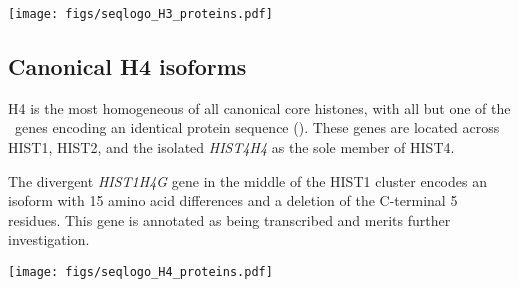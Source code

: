     \begin{table}
      \caption{%
        Canonical H3 encoded protein isoforms.
        Upper panel shows isoform variations relative to most common isoform
        using HGVS recommended nomenclature \citep{mutnomenclature2003}.
        Lower panel shows sequence logo of all isoforms aligned
        with invariant residues in grey.
      }
      \label{tab:H3-consensus}
      
      \texttt{[image: figs/seqlogo\_H3\_proteins.pdf]}
    \end{table}

  \subsection{Canonical H4 isoforms}
    H4 is the most homogeneous of all canonical core histones,
    with all but one of the \HFourCodingGenes{}~genes encoding
    an identical protein sequence ().
    These genes are located across HIST1, HIST2, and the isolated
    \textit{HIST4H4} as the sole member of HIST4.

    The divergent \textit{HIST1H4G} gene in the middle of the HIST1 cluster
    encodes an isoform with 15 amino acid differences and a deletion of the C-terminal 5 residues.
    This gene is annotated as being transcribed and merits further investigation.

    \begin{table}
      \caption{%
        Canonical H4 encoded protein isoforms.
        Upper panel shows isoform variations relative to most common isoform
        using HGVS recommended nomenclature \citep{mutnomenclature2003}.
        Lower panel shows sequence logo of all isoforms aligned
        with invariant residues in grey.
      }
      \label{tab:H4-consensus}
      
      \texttt{[image: figs/seqlogo\_H4\_proteins.pdf]}
    \end{table}
